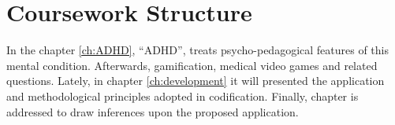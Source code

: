 \section{Coursework Structure}
\label{sc:structure}

In the chapter \ref{ch:ADHD}, ``ADHD'', treats  psycho-pedagogical features of this mental condition. Afterwards, gamification, medical video games and related questions. Lately, in chapter \ref{ch:development} it will presented the application  and methodological principles adopted in codification. Finally, chapter  is addressed to draw inferences upon the proposed application.